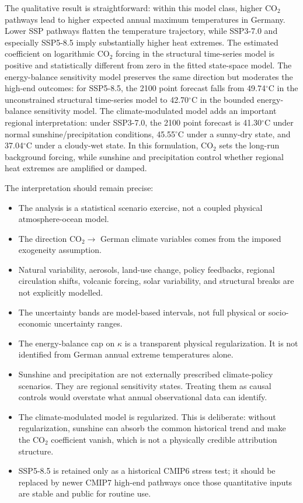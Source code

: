 \documentclass[11pt,a4paper]{article}
\begin{document}
The qualitative result is straightforward: within this model class, higher
CO$_2$ pathways lead to higher expected annual maximum temperatures in Germany.
Lower SSP pathways flatten the temperature trajectory, while SSP3-7.0 and
especially SSP5-8.5 imply substantially higher heat extremes. The estimated
coefficient on logarithmic CO$_2$ forcing in the structural time-series model is
positive and statistically different from zero in the fitted state-space model.
The energy-balance sensitivity model preserves the same direction but moderates
the high-end outcomes: for SSP5-8.5, the 2100 point forecast falls from
49.74$^\circ$C in the unconstrained structural time-series model to
42.70$^\circ$C in the bounded energy-balance sensitivity model.
The climate-modulated model adds an important regional interpretation: under
SSP3-7.0, the 2100 point forecast is 41.30$^\circ$C under normal
sunshine/precipitation conditions, 45.55$^\circ$C under a sunny-dry state, and
37.04$^\circ$C under a cloudy-wet state. In this formulation, CO$_2$ sets the
long-run background forcing, while sunshine and precipitation control whether
regional heat extremes are amplified or damped.

The interpretation should remain precise:
\begin{itemize}
  \item The analysis is a statistical scenario exercise, not a coupled physical
  atmosphere-ocean model.
  \item The direction CO$_2 \rightarrow$ German climate variables comes from the
  imposed exogeneity assumption.
  \item Natural variability, aerosols, land-use change, policy feedbacks,
  regional circulation shifts, volcanic forcing, solar variability, and
  structural breaks are not explicitly modelled.
  \item The uncertainty bands are model-based intervals, not full physical or
  socio-economic uncertainty ranges.
  \item The energy-balance cap on $\kappa$ is a transparent physical
  regularization. It is not identified from German annual extreme temperatures
  alone.
  \item Sunshine and precipitation are not externally prescribed climate-policy
  scenarios. They are regional sensitivity states. Treating them as causal
  controls would overstate what annual observational data can identify.
  \item The climate-modulated model is regularized. This is deliberate: without
  regularization, sunshine can absorb the common historical trend and make the
  CO$_2$ coefficient vanish, which is not a physically credible attribution
  structure.
  \item SSP5-8.5 is retained only as a historical CMIP6 stress test; it should be
  replaced by newer CMIP7 high-end pathways once those quantitative inputs are
  stable and public for routine use.
\end{itemize}
\end{document}
